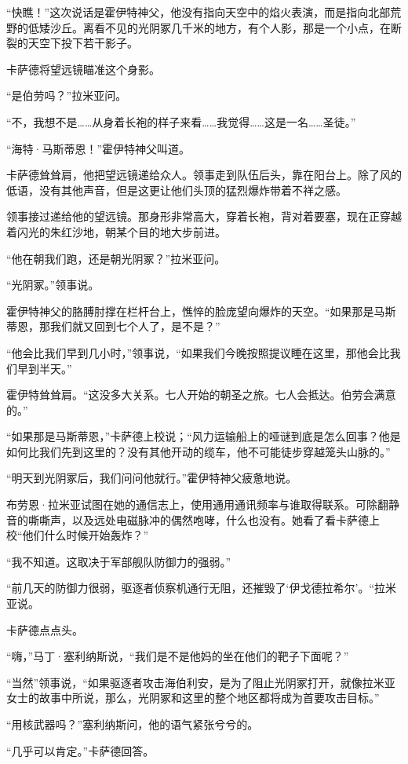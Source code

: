 \documentclass[AutoFakeBold=true]{book}
\begin{document}
``快瞧！''这次说话是霍伊特神父，他没有指向天空中的焰火表演，而是指向北部荒野的低矮沙丘。离看不见的光阴冢几千米的地方，有个人影，那是一个小点，在断裂的天空下投下若干影子。

卡萨德将望远镜瞄准这个身影。

``是伯劳吗？''拉米亚问。

``不，我想不是……从身着长袍的样子来看……我觉得……这是一名……圣徒。''

``海特·马斯蒂恩！''霍伊特神父叫道。

卡萨德耸耸肩，他把望远镜递给众人。领事走到队伍后头，靠在阳台上。除了风的低语，没有其他声音，但是这更让他们头顶的猛烈爆炸带着不祥之感。

领事接过递给他的望远镜。那身形非常高大，穿着长袍，背对着要塞，现在正穿越着闪光的朱红沙地，朝某个目的地大步前进。

``他在朝我们跑，还是朝光阴冢？''拉米亚问。

``光阴冢。''领事说。

霍伊特神父的胳膊肘撑在栏杆台上，憔悴的脸庞望向爆炸的天空。``如果那是马斯蒂恩，那我们就又回到七个人了，是不是？''

``他会比我们早到几小时，''领事说，``如果我们今晚按照提议睡在这里，那他会比我们早到半天。''

霍伊特耸耸肩。``这没多大关系。七人开始的朝圣之旅。七人会抵达。伯劳会满意的。''

``如果那是马斯蒂恩，''卡萨德上校说；``风力运输船上的哑谜到底是怎么回事？他是如何比我们先到这里的？没有其他开动的缆车，他不可能徒步穿越笼头山脉的。''

``明天到光阴冢后，我们问问他就行。''霍伊特神父疲惫地说。

布劳恩·拉米亚试图在她的通信志上，使用通用通讯频率与谁取得联系。可除翻静音的嘶嘶声，以及远处电磁脉冲的偶然咆哮，什么也没有。她看了看卡萨德上校``他们什么时候开始轰炸？''

``我不知道。这取决于军部舰队防御力的强弱。''

``前几天的防御力很弱，驱逐者侦察机通行无阻，还摧毁了`伊戈德拉希尔'。``拉米亚说。

卡萨德点点头。

``嗨，''马丁·塞利纳斯说，``我们是不是他妈的坐在他们的靶子下面呢？''

``当然''领事说，``如果驱逐者攻击海伯利安，是为了阻止光阴冢打开，就像拉米亚女士的故事中所说，那么，光阴冢和这里的整个地区都将成为首要攻击目标。''

``用核武器吗？''塞利纳斯问，他的语气紧张兮兮的。

``几乎可以肯定。''卡萨德回答。
\end{document}
